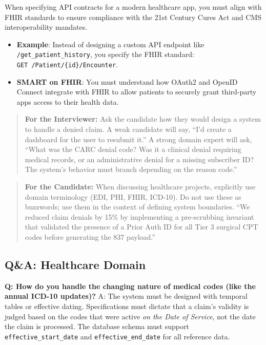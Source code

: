 When specifying API contracts for a modern healthcare app, you must
align with FHIR standards to ensure compliance with the 21st Century
Cures Act and CMS interoperability mandates.

\begin{itemize}
\tightlist
\item
  \textbf{Example}: Instead of designing a custom API endpoint like
  \texttt{/get\_patient\_history}, you specify the FHIR standard:
  \texttt{GET\ /Patient/\{id\}/Encounter}.
\item
  \textbf{SMART on FHIR}: You must understand how OAuth2 and OpenID
  Connect integrate with FHIR to allow patients to securely grant
  third-party apps access to their health data.
\end{itemize}

\begin{quote}
\textbf{For the Interviewer:} Ask the candidate how they would design a
system to handle a denied claim. A weak candidate will say, ``I'd create
a dashboard for the user to resubmit it.'' A strong domain expert will
ask, ``What was the CARC denial code? Was it a clinical denial requiring
medical records, or an administrative denial for a missing subscriber
ID? The system's behavior must branch depending on the reason code.''
\end{quote}

\begin{quote}
\textbf{For the Candidate:} When discussing healthcare projects,
explicitly use domain terminology (EDI, PHI, FHIR, ICD-10). Do not use
these as buzzwords; use them in the context of defining system
boundaries. ``We reduced claim denials by 15\% by implementing a
pre-scrubbing invariant that validated the presence of a Prior Auth ID
for all Tier 3 surgical CPT codes before generating the 837 payload.''
\end{quote}

\subsection{Q\&A: Healthcare Domain}\label{qa-healthcare-domain}

\textbf{Q: How do you handle the changing nature of medical codes (like
the annual ICD-10 updates)?} A: The system must be designed with
temporal tables or effective dating. Specifications must dictate that a
claim's validity is judged based on the codes that were active \emph{on
the Date of Service}, not the date the claim is processed. The database
schema must support \texttt{effective\_start\_date} and
\texttt{effective\_end\_date} for all reference data.

